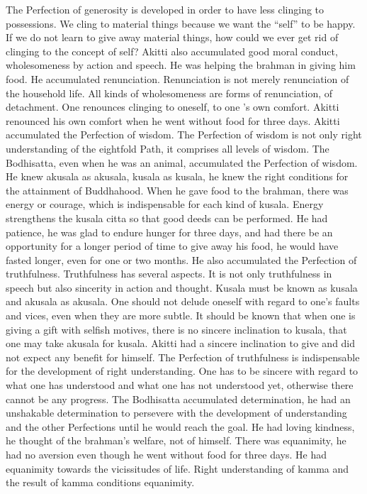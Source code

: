 \documentclass{book}
\begin{document}
The Perfection of generosity is developed in order to have less clinging
to possessions. We cling to material things because we want the ``self''
to be happy. If we do not learn to give away material things, how could
we ever get rid of clinging to the concept of self? Akitti also
accumulated good moral conduct, wholesomeness by action and speech. He
was helping the brahman in giving him food. He accumulated renunciation.
Renunciation is not merely renunciation of the household life. All kinds
of whole­someness are forms of renunciation, of detachment. One
renounces clinging to oneself, to one 's own comfort. Akitti renounced
his own comfort when he went without food for three days. Akitti
accumulated the Perfection of wisdom. The Perfection of wisdom is not
only right understanding of the eightfold Path, it comprises all levels
of wisdom. The Bodhisatta, even when he was an animal, accumulated the
Perfection of wisdom. He knew akusala as akusala, kusala as kusala, he
knew the right conditions for the attainment of Buddhahood. When he gave
food to the brahman, there was energy or courage, which is indispensable
for each kind of kusala. Energy strengthens the kusala citta so that
good deeds can be performed. He had patience, he was glad to endure
hunger for three days, and had there be an opportunity for a longer
period of time to give away his food, he would have fasted longer, even
for one or two months. He also accumulated the Perfection of
truth­fulness. Truthfulness has several aspects. It is not only
truthfulness in speech but also sincerity in action and thought. Kusala
must be known as kusala and akusala as akusala. One should not delude
oneself with regard to one's faults and vices, even when they are more
subtle. It should be known that when one is giving a gift with selfish
motives, there is no sincere inclination to kusala, that one may take
akusala for kusala. Akitti had a sincere inclin­ation to give and did
not expect any benefit for himself. The Perfection of truthfulness is
indispensable for the development of right understanding. One has to be
sincere with regard to what one has understood and what one has not
understood yet, otherwise there cannot be any pro­gress. The Bodhisatta
accumulated determination, he had an unshakable determination to
persevere with the devel­op­ment of understanding and the other
Perfections until he would reach the goal. He had loving kindness, he
thought of the brahman's welfare, not of himself. There was equanimity,
he had no aversion even though he went without food for three days. He
had equanimity towards the vicissitudes of life. Right understanding of
kamma and the result of kamma conditions equanimity.
\end{document}
